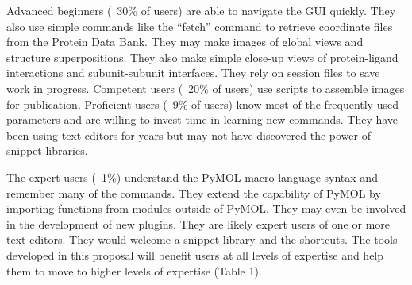 Advanced beginners (~30\% of users) are able to navigate the GUI quickly. 
They also use simple commands like the ``fetch'' command to retrieve coordinate files from the Protein Data Bank. 
They may make images of global views and structure superpositions. 
They also make simple close-up views of protein-ligand interactions and subunit-subunit interfaces. 
They rely on session files to save work in progress. 
Competent users (~20\% of users) use scripts to assemble images for publication.
Proficient users (~9\% of users) know most of the frequently used parameters and are willing to invest time in learning new commands. 
They have been using text editors for years but may not have discovered the power of snippet libraries. 

The expert users (~1\%) understand the PyMOL macro language syntax and remember many of the commands. 
They extend the capability of PyMOL by importing functions from modules outside of PyMOL.
They may even be involved in the development of new plugins. 
They are likely expert users of one or more text editors. 
They would welcome a snippet library and the shortcuts. 
The tools developed in this proposal will benefit users at all levels of expertise and help them to move to higher levels of expertise (Table 1).



